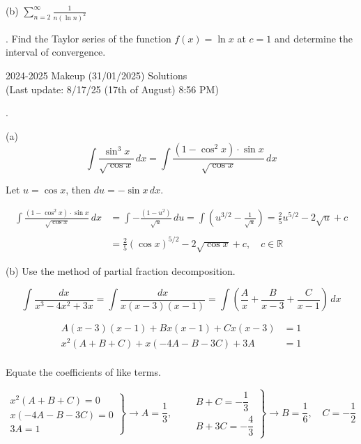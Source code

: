 \documentclass{article}
\begin{document}
\noindent (b) $\displaystyle\sum_{n=2}^\infty\frac1{n(\ln n)^2}$

\hfill

. Find the Taylor series of the function $f(x)=\ln x$ at $c=1$ and determine the interval of convergence.

\newpage

\begin{center}
2024-2025 Makeup (31/01/2025) Solutions\\
(Last update: 8/17/25 (17th of August) 8:56 PM)
\end{center}

.

\hfill

\noindent (a)
\[\int\frac{\sin^3x}{\sqrt{\cos x}}\,dx=\int\frac{\left(1-\cos^2x\right)\cdot\sin x}{\sqrt{\cos x}}\,dx\]

\hfill

\noindent Let $u=\cos x$, then $du=-\sin x\,dx$.

\begin{align*}\int\frac{\left(1-\cos^2x\right)\cdot\sin x}{\sqrt{\cos x}}\,dx&=\int-\frac{\left(1-u^2\right)}{\sqrt{u}}\,du=\int\left(u^{3/2}-\frac1{\sqrt u}\right)=\frac25u^{5/2}-2\sqrt u+c\\\\&=\boxed{\frac25\left(\cos x\right)^{5/2}-2\sqrt{\cos x}+c,\quad c\in\mathbb{R}}\end{align*}

\hfill

\noindent (b) Use the method of partial fraction decomposition.

\[\int\frac{dx}{x^3-4x^2+3x}=\int\frac{dx}{x(x-3)(x-1)}=\int\left(\frac Ax+\frac B{x-3}+\frac C{x-1}\right)\,dx\]

\[\begin{array}{rc}A(x-3)(x-1)+Bx(x-1)+Cx(x-3)&=1\\x^2(A+B+C)+x(-4A-B-3C)+3A&=1\\&\end{array}\]

\hfill

\noindent Equate the coefficients of like terms.

\[\left.\begin{array}{r}
x^2(A+B+C)=0\\
x(-4A-B-3C)=0\\
3A=1
\end{array}\right\}\rightarrow A=\frac13,\qquad\left.\begin{array}{r}
B+C=-\dfrac13\\[1em]
B+3C=-\dfrac43
\end{array}\right\}\rightarrow B=\frac16,\quad C=-\frac12\]
\end{document}
